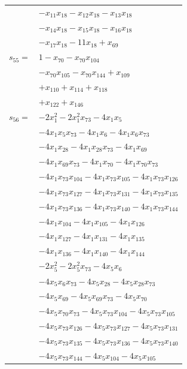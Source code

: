 \begin{longtable}{@{}r@{\;}l@{}}
 & \(\displaystyle -x_{11}x_{18} -x_{12}x_{18} -x_{13}x_{18}\) \\
 & \(\displaystyle -x_{14}x_{18} -x_{15}x_{18} -x_{16}x_{18}\) \\
 & \(\displaystyle -x_{17}x_{18} -11x_{18} +x_{69}\) \\[3pt]
\(s_{55}=\) & \(\displaystyle 1 -x_{70} -x_{70}x_{104}\) \\
 & \(\displaystyle -x_{70}x_{105} -x_{70}x_{144} +x_{109}\) \\
 & \(\displaystyle +x_{110} +x_{114} +x_{118}\) \\
 & \(\displaystyle +x_{122} +x_{146}\) \\[3pt]
\(s_{56}=\) & \(\displaystyle -2x_{1}^{2} -2x_{1}^{2}x_{73} -4x_{1}x_{5}\) \\
 & \(\displaystyle -4x_{1}x_{5}x_{73} -4x_{1}x_{6} -4x_{1}x_{6}x_{73}\) \\
 & \(\displaystyle -4x_{1}x_{28} -4x_{1}x_{28}x_{73} -4x_{1}x_{69}\) \\
 & \(\displaystyle -4x_{1}x_{69}x_{73} -4x_{1}x_{70} -4x_{1}x_{70}x_{73}\) \\
 & \(\displaystyle -4x_{1}x_{73}x_{104} -4x_{1}x_{73}x_{105} -4x_{1}x_{73}x_{126}\) \\
 & \(\displaystyle -4x_{1}x_{73}x_{127} -4x_{1}x_{73}x_{131} -4x_{1}x_{73}x_{135}\) \\
 & \(\displaystyle -4x_{1}x_{73}x_{136} -4x_{1}x_{73}x_{140} -4x_{1}x_{73}x_{144}\) \\
 & \(\displaystyle -4x_{1}x_{104} -4x_{1}x_{105} -4x_{1}x_{126}\) \\
 & \(\displaystyle -4x_{1}x_{127} -4x_{1}x_{131} -4x_{1}x_{135}\) \\
 & \(\displaystyle -4x_{1}x_{136} -4x_{1}x_{140} -4x_{1}x_{144}\) \\
 & \(\displaystyle -2x_{5}^{2} -2x_{5}^{2}x_{73} -4x_{5}x_{6}\) \\
 & \(\displaystyle -4x_{5}x_{6}x_{73} -4x_{5}x_{28} -4x_{5}x_{28}x_{73}\) \\
 & \(\displaystyle -4x_{5}x_{69} -4x_{5}x_{69}x_{73} -4x_{5}x_{70}\) \\
 & \(\displaystyle -4x_{5}x_{70}x_{73} -4x_{5}x_{73}x_{104} -4x_{5}x_{73}x_{105}\) \\
 & \(\displaystyle -4x_{5}x_{73}x_{126} -4x_{5}x_{73}x_{127} -4x_{5}x_{73}x_{131}\) \\
 & \(\displaystyle -4x_{5}x_{73}x_{135} -4x_{5}x_{73}x_{136} -4x_{5}x_{73}x_{140}\) \\
 & \(\displaystyle -4x_{5}x_{73}x_{144} -4x_{5}x_{104} -4x_{5}x_{105}\) \\

\end{longtable}
